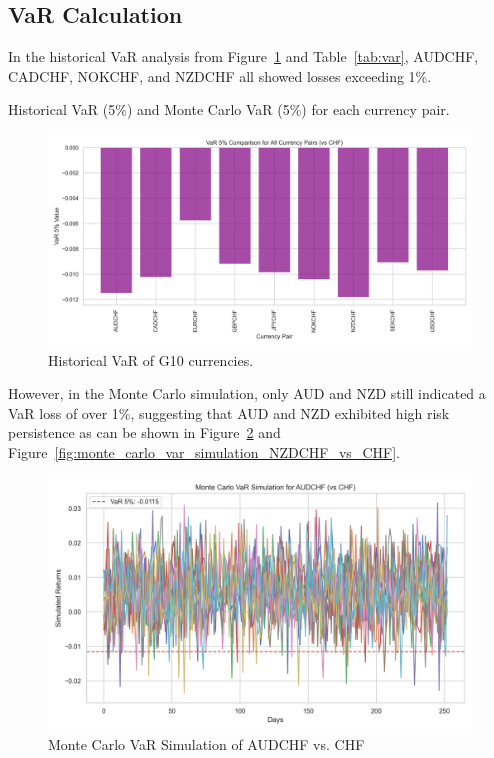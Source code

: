 \documentclass{article}
\begin{document}
\subsection{VaR Calculation}
In the historical VaR analysis from Figure~\ref{fig:historical_VaR} and Table~\ref{tab:var}, AUDCHF, CADCHF, NOKCHF, and NZDCHF all showed losses exceeding 1\%. 

\begin{table}[H]
\centering
\caption{Historical VaR (5\%) and Monte Carlo VaR (5\%) for each currency pair.} 
\label{tab:var}
\end{table}

\begin{figure}[H]
    \centering   \includegraphics[width=0.75\linewidth]{reports/figures/var_5_percent_comparison_plot.png}
    \caption{Historical VaR of G10 currencies.}
    \label{fig:historical_VaR}
\end{figure}

However, in the Monte Carlo simulation, only AUD and NZD still indicated a VaR loss of over 1\%, suggesting that AUD and NZD exhibited high risk persistence as can be shown in Figure~\ref{fig:monte_carlo_var_simulation_AUDCHF_vs_CHF} and Figure~\ref{fig:monte_carlo_var_simulation_NZDCHF_vs_CHF}.

\begin{figure}[H]
    \centering   
    \includegraphics[width=0.75\linewidth]{reports/figures/monte_carlo_var_simulation_AUDCHF_vs_CHF.png}
    \caption{Monte Carlo VaR Simulation of AUDCHF vs. CHF}  \label{fig:monte_carlo_var_simulation_AUDCHF_vs_CHF}
\end{figure}
\end{document}
